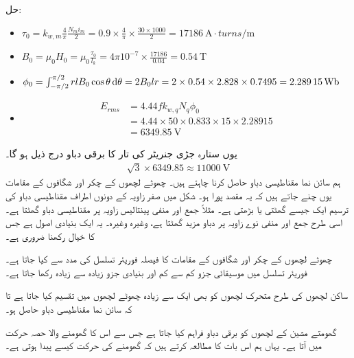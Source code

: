 حل:
\begin{itemize}
\item
\(
\tau_0=k_{w,m} \frac{4}{\pi}\frac{N_m i_m}{2}=0.9 \times \frac{4}{\pi} \times \frac{30 \times 1000}{2}=\SI{17186}{\ampere \cdot turns \per \meter}
\)
\item
\(
B_0=\mu_0 H_0=\mu_0 \frac{\tau_0}{l_k}=4 \pi 10^{-7} \times \frac{17186}{0.04}=\SI{0.54}{\tesla}
\)
\item
\(
\phi_0=\int_{-\pi/2}^{\pi/2}rl B_0\cos \theta \dif \theta=2 B_0 l r =2 \times 0.54 \times 2.828 \times 0.7495=\SI{2.28915}{\weber}
\)
\item
\begin{align*}
E_{rms}&=4.44 f k_{w,q} N_q \phi_0\\
&=4.44 \times 50 \times 0.833 \times 15 \times 2.28915\\
&=\SI{6349.85}{\volt} 
\end{align*}
\end{itemize}
یوں ستارہ جڑی جنریٹر کی تار کا برقی دباو درج ذیل ہو گا۔
\begin{align*}
\sqrt{3} \times 6349.85 \approx \SI{11000}{\volt}
\end{align*}
%
ہم  سائن نما مقناطیسی دباو حاصل کرنا چاہتے ہیں۔ چھوٹے لچھوں کے چکر اور شگافوں کے مقامات یوں چنے جاتے ہیں کہ یہ مقصد پورا ہو۔ شکل   میں  صفر زاویہ کے دونوں اطراف مقناطیسی دباو کی ترسیم ایک جیسے گھٹتی یا بڑھتی ہے۔ مثلاً جمع اور منفی  پینتالیس زاویہ پر مقناطیسی دباو    گھٹتا ہے۔ اسی طرح جمع اور منفی نوے زاویہ پر دباو مزید   گھٹتا ہے، وغیرہ وغیرہ۔ یہ ایک بنیادی اصول ہے جس کا خیال رکھنا ضروری ہے۔

چھوٹے لچھوں کے چکر اور شگافوں کے مقامات کا فیصلہ فوریئر تسلسل کی مدد سے کیا جاتا ہے۔فوریئر تسلسل میں موسیقائی جزو  کم سے کم اور بنیادی جزو  زیادہ سے زیادہ رکھا جاتا ہے۔

ساکن لچھوں کی طرح متحرک لچھوں کو بھی ایک سے زیادہ چھوٹے لچھوں میں تقسیم کیا جاتا ہے تا کہ سائن نما مقناطیسی دباو حاصل ہو۔

گھومتے مشین کے لچھوں کو برقی دباو فراہم کیا جاتا ہے جس سے اس کا گھومنے والا حصہ حرکت میں آتا ہے۔ یہاں ہم اس بات کا مطالعہ کرتے ہیں کہ گھومنے کی حرکت کیسے پیدا ہوتی ہے۔

